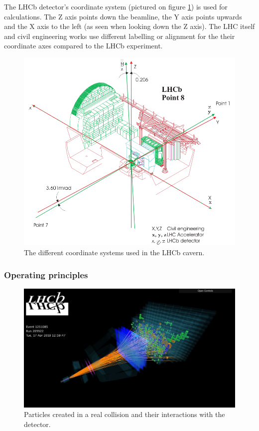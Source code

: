 \documentclass[12pt]{article}
\begin{document}
The LHCb detector's coordinate system (pictured on figure \ref{fig_lhcb_coordinate_systems}) is used for calculations. The Z axis points down the beamline, the Y axis points upwards and the X axis to the left (as seen when looking down the Z axis). The LHC itself and civil engineering works use different labelling or alignment for the their coordinate axes compared to the LHCb experiment.

\begin{figure}[H]
	\includegraphics[width=\textwidth]{intro_lhcb_coordinate_systems}
	\caption[LHCb coordinate systems]{The different coordinate systems used in the LHCb cavern. \cite{lhcb_coordinate_systems}}
	\label{fig_lhcb_coordinate_systems}
\end{figure}


\subsubsection{Operating principles}\label{sec_lhcb_det_theory}

\begin{figure}[h]
	\includegraphics[width=\textwidth]{lbevent_collision_example}
	\caption[A particle collision event in LHCb]{Particles created in a real collision and their interactions with the detector. \cite{lb_event_display}}
	\label{fig_lhcb_lbevent_collision}
\end{figure}
\end{document}
